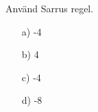 Använd Sarrus regel.
\begin{itemize}
	\item[a) ] -4
	\item[b) ] 4
	\item[c) ] -4
	\item[d) ] -8
\end{itemize}